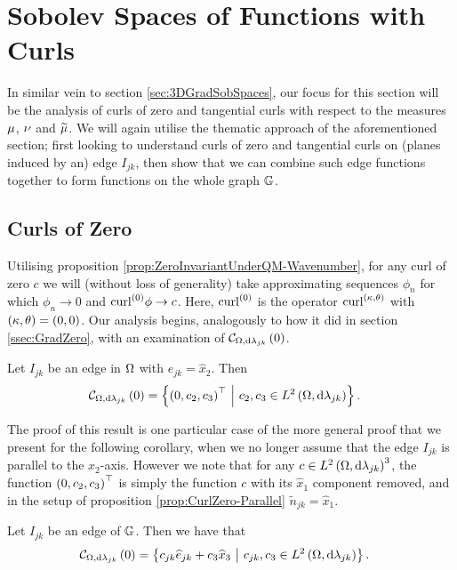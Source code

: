 \section{Sobolev Spaces of Functions with Curls} \label{sec:CC-CurlAnalysis}
In similar vein to section \ref{sec:3DGradSobSpaces}, our focus for this section will be the analysis of curls of zero and tangential curls with respect to the measures $\mu$, $\nu$ and $\widetilde{\mu}$.
We will again utilise the thematic approach of the aforementioned section; first looking to understand curls of zero and tangential curls on (planes induced by an) edge $I_{jk}$, then show that we can combine such edge functions together to form functions on the whole graph $\mathbb{G}$.

\subsection{Curls of Zero} \label{ssec:CurlsOfZero}
Utilising proposition \ref{prop:ZeroInvariantUnderQM-Wavenumber}, for any curl of zero $c$ we will (without loss of generality) take approximating sequences $\phi_n$ for which $\phi_n\rightarrow0$ and $\mathrm{curl}_{}^{(0)}\phi\rightarrow c$.
Here, $\mathrm{curl}_{}^{(0)}$ is the operator $\mathrm{curl}_{}^{\left( \kappa, \theta \right)}$ with $\left( \kappa, \theta \right)=\left( 0,0 \right)$.
Our analysis begins, analogously to how it did in section \ref{ssec:GradZero}, with an examination of $\mathcal{C}_{ \Omega, \mathrm{d}\lambda_{jk}}\left( 0 \right)$.
\begin{prop} \label{prop:CurlZero-Parallel}
	Let $I_{jk}$ be an edge in $\Omega$ with $e_{jk} = \widehat{x}_2$.
	Then
	\begin{align*}
		\mathcal{C}_{ \Omega, \mathrm{d}\lambda_{jk}}\left( 0 \right) &= \left\{  \left( 0,c_2,c_3 \right)^\top \ \middle\vert \  c_2,c_3\in L^{2}\left( \Omega,\mathrm{d} \lambda_{jk} \right)  \right\}.
	\end{align*}
\end{prop}
The proof of this result is one particular case of the more general proof that we present for the following corollary, when we no longer assume that the edge $I_{jk}$ is parallel to the $x_2$-axis.
However we note that for any $c\in L^{2}\left( \Omega,\mathrm{d} \lambda_{jk} \right)^3$, the function $\left( 0,c_2,c_3 \right)^{\top}$ is simply the function $c$ with its $\widehat{x}_1$ component removed, and in the setup of proposition \ref{prop:CurlZero-Parallel} $\widetilde{n}_{jk} = \widehat{x}_1$.
\begin{cory} \label{cory:CurlZero-Rotated}
	Let $I_{jk}$ be an edge of $\mathbb{G}$.
	Then we have that
	\begin{align*}
		\mathcal{C}_{ \Omega, \mathrm{d}\lambda_{jk}}\left( 0 \right) &= \left\{  c_{jk}\widehat{e}_{jk} + c_3\widehat{x}_3 \ \middle\vert \  c_{jk},c_3\in L^{2}\left( \Omega,\mathrm{d} \lambda_{jk} \right)  \right\}.
	\end{align*}
\end{cory}
